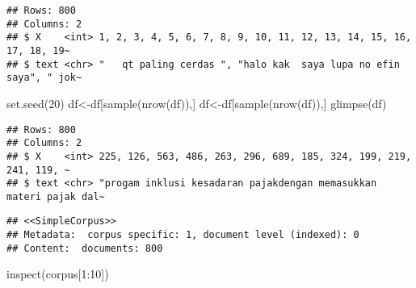 \documentclass[
]{article}
\newenvironment{Shaded}{\begin{snugshade}}{\end{snugshade}}
\newcommand{\DecValTok}[1]{\textcolor[rgb]{0.00,0.00,0.81}{#1}}
\newcommand{\FunctionTok}[1]{\textcolor[rgb]{0.00,0.00,0.00}{#1}}
\newcommand{\NormalTok}[1]{#1}
\newcommand{\OtherTok}[1]{\textcolor[rgb]{0.56,0.35,0.01}{#1}}
\newcommand{\SpecialCharTok}[1]{\textcolor[rgb]{0.00,0.00,0.00}{#1}}
\begin{document}
\begin{verbatim}
## Rows: 800
## Columns: 2
## $ X    <int> 1, 2, 3, 4, 5, 6, 7, 8, 9, 10, 11, 12, 13, 14, 15, 16, 17, 18, 19~
## $ text <chr> "   qt paling cerdas ", "halo kak  saya lupa no efin saya", " jok~
\end{verbatim}

\begin{Shaded}
\begin{Highlighting}[]
\FunctionTok{set.seed}\NormalTok{(}\DecValTok{20}\NormalTok{)}
\NormalTok{df}\OtherTok{\textless{}{-}}\NormalTok{df[}\FunctionTok{sample}\NormalTok{(}\FunctionTok{nrow}\NormalTok{(df)),]}
\NormalTok{df}\OtherTok{\textless{}{-}}\NormalTok{df[}\FunctionTok{sample}\NormalTok{(}\FunctionTok{nrow}\NormalTok{(df)),]}
\FunctionTok{glimpse}\NormalTok{(df)}
\end{Highlighting}
\end{Shaded}

\begin{verbatim}
## Rows: 800
## Columns: 2
## $ X    <int> 225, 126, 563, 486, 263, 296, 689, 185, 324, 199, 219, 241, 119, ~
## $ text <chr> "progam inklusi kesadaran pajakdengan memasukkan materi pajak dal~
\end{verbatim}

\begin{Shaded}
\end{Shaded}

\begin{verbatim}
## <<SimpleCorpus>>
## Metadata:  corpus specific: 1, document level (indexed): 0
## Content:  documents: 800
\end{verbatim}

\begin{Shaded}
\begin{Highlighting}[]
\FunctionTok{inspect}\NormalTok{(corpus[}\DecValTok{1}\SpecialCharTok{:}\DecValTok{10}\NormalTok{])}
\end{Highlighting}
\end{Shaded}
\end{document}
